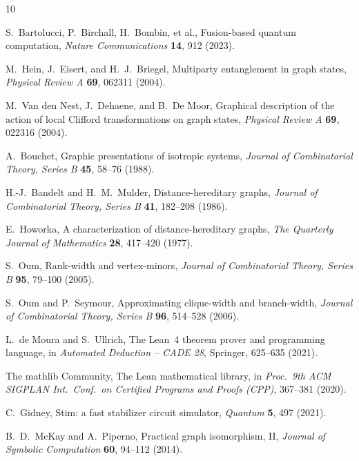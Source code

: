 \documentclass[11pt]{article}
\theoremstyle{definition}
\theoremstyle{remark}
\begin{document}
\begin{thebibliography}{10}

S.~Bartolucci, P.~Birchall, H.~Bomb\'in, et al.,
\newblock Fusion-based quantum computation,
\newblock \emph{Nature Communications} \textbf{14}, 912 (2023).

M.~Hein, J.~Eisert, and H.~J.~Briegel,
\newblock Multiparty entanglement in graph states,
\newblock \emph{Physical Review A} \textbf{69}, 062311 (2004).

M.~Van den Nest, J.~Dehaene, and B.~De Moor,
\newblock Graphical description of the action of local Clifford transformations on graph states,
\newblock \emph{Physical Review A} \textbf{69}, 022316 (2004).

A.~Bouchet,
\newblock Graphic presentations of isotropic systems,
\newblock \emph{Journal of Combinatorial Theory, Series B} \textbf{45}, 58--76 (1988).

H.-J.~Bandelt and H.~M.~Mulder,
\newblock Distance-hereditary graphs,
\newblock \emph{Journal of Combinatorial Theory, Series B} \textbf{41}, 182--208 (1986).

E.~Howorka,
\newblock A characterization of distance-hereditary graphs,
\newblock \emph{The Quarterly Journal of Mathematics} \textbf{28}, 417--420 (1977).

S.~Oum,
\newblock Rank-width and vertex-minors,
\newblock \emph{Journal of Combinatorial Theory, Series B} \textbf{95}, 79--100 (2005).

S.~Oum and P.~Seymour,
\newblock Approximating clique-width and branch-width,
\newblock \emph{Journal of Combinatorial Theory, Series B} \textbf{96}, 514--528 (2006).

L.~de Moura and S.~Ullrich,
\newblock The Lean~4 theorem prover and programming language,
\newblock in \emph{Automated Deduction -- CADE 28}, Springer, 625--635 (2021).

The mathlib Community,
\newblock The Lean mathematical library,
\newblock in \emph{Proc.\ 9th ACM SIGPLAN Int.\ Conf.\ on Certified Programs and Proofs (CPP)}, 367--381 (2020).

C.~Gidney,
\newblock Stim: a fast stabilizer circuit simulator,
\newblock \emph{Quantum} \textbf{5}, 497 (2021).

B.~D.~McKay and A.~Piperno,
\newblock Practical graph isomorphism, II,
\newblock \emph{Journal of Symbolic Computation} \textbf{60}, 94--112 (2014).

\end{thebibliography}
\end{document}
